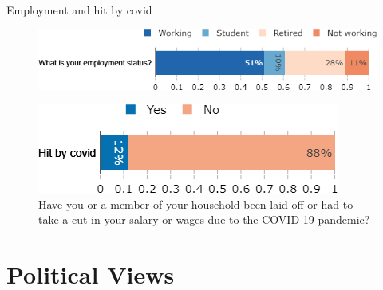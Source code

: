 \documentclass[aspectratio=169,9pt,dvipsnames]{beamer}
\begin{document}
\begin{frame}{Employment and hit by covid}%
\begin{figure}[h!]
\centering
\captionsetup{justification=centering}
\caption{What is your employment status?}
\includegraphics[width=.8\textwidth]{../figures/DK/employment_status_DK.png} \\
\vspace{.5cm}
\caption{Have you or a member of your household been laid off or had to take a cut in your salary or wages due to the COVID-19 pandemic?}
\includegraphics[width=.55\textwidth]{../figures/DK/hit_by_covid_DK.png}
\end{figure}
\end{frame}


\section{Political Views}
\end{document}
